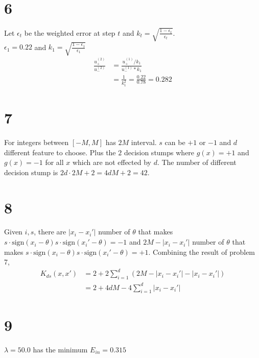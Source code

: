\documentclass[12pt]{article}
\begin{document}
\section*{6}
Let $\epsilon_t$ be the weighted error at step $t$ and $k_t = \sqrt{\frac{1- \epsilon_t}{\epsilon_t}}$. \\
$\epsilon_1 = 0.22$ and $k_1 = \sqrt{\frac{1- \epsilon_1}{\epsilon_1}}$
\begin{equation*}
\begin{split}
    \frac{u_+^{(2)}} {u_-^{(2)}} &= \frac{u_+^{(1)} / k_1 } {u_-^{(1)} * k_1} \\
    &= \frac{1}{k_1^2} = \frac{0.22}{0.78} = 0.282
\end{split}
\end{equation*}

\section*{7}
For integers between $[-M, M]$ has $2M$ interval. $s$ can be $+1$ or $-1$ and $d$ different feature to choose.
Plus the $2$ decision stumps where $g(x)=+1$ and $g(x)=-1$ for all $x$ which are not effected by $d$. 
The number of different decision stump is $2d \cdot 2M+2 = 4dM+2 = 42$. 

\section*{8}
Given $i, s$, there are $|x_i - x_i'|$ number of $\theta$ that makes 
$s \cdot \text{sign}(x_i - \theta) s\cdot \text{sign}(x_i' - \theta) = -1$
and $2M - |x_i - x_i'|$ number of $\theta$ that makes
$s \cdot \text{sign}(x_i - \theta) s\cdot \text{sign}(x_i' - \theta) = +1$.
Combining the result of problem 7,
\begin{equation*}
    \begin{split}
    K_{ds}(x, x') &= 2 + 2 \sum_{i=1}^d (2M - |x_i - x_i'| - |x_i - x_i'|) \\
    &= 2 + 4dM -4\sum_{i=1}^d |x_i - x_i'|
\end{split}
\end{equation*}


\section*{9}
$\lambda = 50.0$ has the minimum $E_{in} = 0.315$
\end{document}
